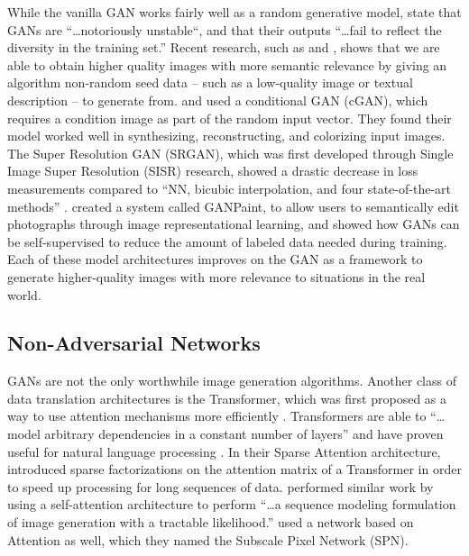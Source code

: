 \documentclass{article}
\begin{document}
While the vanilla GAN works fairly well as a random generative model,
\cite{image_transformer} state that GANs are
``\dots notoriously unstable``, and that their outputs
``\dots fail to reflect the diversity in the training set.''
Recent research, such as \cite{texture_synthesis} and \cite{multiscale_video},
shows that we are able to obtain
higher quality images with more semantic relevance by giving
an algorithm non-random seed data
-- such as a low-quality image or textual description -- to generate from.
\cite{image_to_image} and \cite{deep_video} used a conditional GAN (cGAN),
which requires a condition image as part of the random input vector.
They found their model worked well in
synthesizing, reconstructing, and colorizing input images.
The Super Resolution GAN (SRGAN), which was first developed through
Single Image Super Resolution (SISR) research,
showed a drastic decrease in loss measurements
compared to ``NN, bicubic interpolation, and four state-of-the-art methods''
\cite{srgan}.
\cite{semantic_photo} created a system called GANPaint, to allow users to
semantically edit photographs through image representational learning,
and \cite{fewer_labels} showed how GANs can be self-supervised to reduce
the amount of labeled data needed during training.
Each of these model architectures improves on the GAN as a framework to generate
higher-quality images with more relevance to situations in the real world.

\subsection{Non-Adversarial Networks}
\label{subsec:non_adversarial}
GANs are not the only worthwhile image generation algorithms.
Another class of data translation architectures is the Transformer,
which was first proposed as a way to use attention mechanisms more efficiently
\cite{attention_need}.
Transformers are able to ``\dots model arbitrary dependencies
in a constant number of layers'' and have proven useful for natural language processing \cite{generative_transformers}.
In their Sparse Attention architecture,
\cite{sparse_transformers} introduced sparse factorizations on the attention matrix
of a Transformer in order to speed up processing for long sequences of
data.
\cite{image_transformer} performed similar work by using a self-attention
architecture to perform
``\dots a sequence
modeling formulation of image generation with
a tractable likelihood.''
\cite{subscale_pixel} used a network based on Attention as well, which they named
the Subscale Pixel Network (SPN).
 
\end{document}
